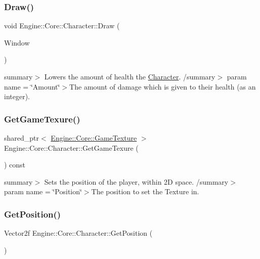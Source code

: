 \subsubsection{\texorpdfstring{Draw()}{Draw()}}
{\footnotesize\ttfamily void Engine\+::\+Core\+::\+Character\+::\+Draw (\begin{DoxyParamCaption}\item[{Render\+Window $\ast$}]{Window }\end{DoxyParamCaption})}

summary$>$ Lowers the amount of health the \hyperlink{class_engine_1_1_core_1_1_character}{Character}. /summary$>$ param name = \char`\"{}\+Amount\char`\"{}$>$The amount of damage which is given to their health (as an integer).\mbox{\label{class_engine_1_1_core_1_1_character_afff37c4ff688837f42509f721853bab8}} 
\subsubsection{\texorpdfstring{Get\+Game\+Texure()}{GetGameTexure()}}
{\footnotesize\ttfamily shared\+\_\+ptr$<$ \hyperlink{class_engine_1_1_core_1_1_game_texture}{Engine\+::\+Core\+::\+Game\+Texture} $>$ Engine\+::\+Core\+::\+Character\+::\+Get\+Game\+Texure (\begin{DoxyParamCaption}\item[{void}]{ }\end{DoxyParamCaption}) const}

summary$>$ Sets the position of the player, within 2D space. /summary$>$ param name = \char`\"{}\+Position\char`\"{}$>$The position to set the Texture in.\mbox{\label{class_engine_1_1_core_1_1_character_aea290308ddc56ab784c87f85e6b7f254}} 
\subsubsection{\texorpdfstring{Get\+Position()}{GetPosition()}}
{\footnotesize\ttfamily Vector2f Engine\+::\+Core\+::\+Character\+::\+Get\+Position (\begin{DoxyParamCaption}\item[{void}]{ }\end{DoxyParamCaption})}

